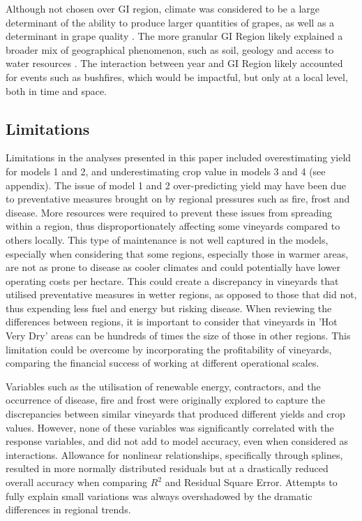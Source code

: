 \documentclass[review,12pt,authoryear]{elsarticle}
\begin{document}
\begin{linenumbers}
Although not chosen over GI region, climate was considered to be a large determinant of the ability to produce larger quantities of grapes, as well as a determinant in grape quality \citep{agostaRegionalClimateVariability2012}. The more granular GI Region likely explained a broader mix of geographical phenomenon, such as soil, geology and access to water resources \citep{abbalDecisionSupportSystem2016,carmonaUseParticipatoryObjectOriented2011}. The interaction between year and GI Region likely accounted for events such as bushfires, which would be impactful, but only at a local level, both in time and space.

\subsection{Limitations}
Limitations in the analyses presented in this paper included overestimating yield for models 1 and 2, and underestimating crop value in models 3 and 4 (see appendix).
The issue of model 1 and 2 over-predicting yield may have been due to preventative measures brought on by regional pressures such as fire, frost and disease. More resources were required to prevent these issues from spreading within a region, thus disproportionately affecting some vineyards compared to others locally. This type of maintenance is not well captured in the models, especially when considering that some regions, especially those in warmer areas, are not as prone to disease as cooler climates and could potentially have lower operating costs per hectare. This could create a discrepancy in vineyards that utilised preventative measures in wetter regions, as opposed to those that did not, thus expending less fuel and energy but risking disease. When reviewing the differences between regions, it is important to consider that vineyards in 'Hot Very Dry' areas can be hundreds of times the size of those in other regions. This limitation could be overcome by incorporating the profitability of vineyards, comparing the financial success of working at different operational scales.
\par
Variables such as the utilisation of renewable energy, contractors, and the occurrence of disease, fire and frost were originally explored to capture the discrepancies between similar vineyards that produced different  yields and crop values. However, none of these variables was significantly correlated with the response variables, and did not add to model accuracy, even when considered as interactions. Allowance for nonlinear relationships, specifically through splines, resulted in more normally distributed residuals but at a drastically reduced overall accuracy when comparing $R^2$ and Residual Square Error. Attempts to fully explain small variations was always overshadowed by the dramatic differences in regional trends.

\end{linenumbers}
\end{document}
